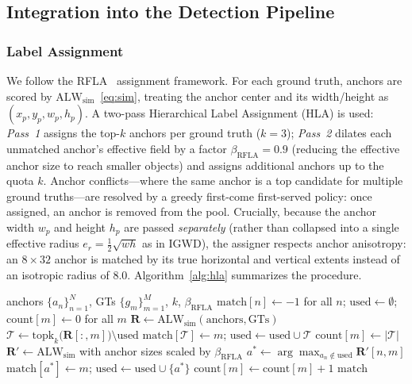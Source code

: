 \documentclass[journal]{IEEEtran}
\newcommand{\alw}{\text{ALW}}
\begin{document}
\subsection{Integration into the Detection Pipeline}

\subsubsection{Label Assignment}

We follow the RFLA~\cite{xu2022rfla} assignment framework. For each ground truth, anchors
are scored by $\alw_{\text{sim}}$~\eqref{eq:sim}, treating the anchor center
and its width/height as $(x_p,y_p,w_p,h_p)$. A two-pass Hierarchical Label
Assignment (HLA) is used: \emph{Pass~1} assigns the top-$k$ anchors per
ground truth ($k=3$); \emph{Pass~2} dilates each unmatched anchor's effective
field by a factor $\beta_{\text{RFLA}}=0.9$ (reducing the effective anchor size to
reach smaller objects) and assigns additional anchors up to the quota $k$.
Anchor conflicts---where the same anchor is a top candidate for multiple
ground truths---are resolved by a greedy first-come first-served policy:
once assigned, an anchor is removed from the pool.
Crucially, because the
anchor width $w_p$ and height $h_p$ are passed \emph{separately} (rather than
collapsed into a single effective radius $e_r=\tfrac12\sqrt{wh}$ as in IGWD),
the assigner respects anchor anisotropy: an $8\times32$ anchor is matched by
its true horizontal and vertical extents instead of an isotropic radius of
$8.0$. Algorithm~\ref{alg:hla} summarizes the procedure.

\begin{algorithm}[t]
\caption{ALW Hierarchical Label Assignment}
\label{alg:hla}
\begin{algorithmic}[1]
\Require anchors $\{a_n\}_{n=1}^{N}$, GTs $\{g_m\}_{m=1}^{M}$, $k$, $\beta_{\text{RFLA}}$
\State $\text{match}[n]\gets -1$ for all $n$;
  $\text{used}\gets\emptyset$;
  $\text{count}[m]\gets 0$ for all $m$
\State $\mathbf{R}\gets \alw_{\text{sim}}(\text{anchors},\text{GTs})$ 
 
  \State $\mathcal{T}\gets \mathrm{topk}_k\big(\mathbf{R}[:,m]\big) \setminus \text{used}$
  \State $\text{match}[\mathcal{T}]\gets m$;\; $\text{used}\gets \text{used}\cup\mathcal{T}$
  \State $\text{count}[m]\gets |\mathcal{T}|$
\EndFor
\State $\mathbf{R}'\gets \alw_{\text{sim}}$ with anchor sizes scaled by $\beta_{\text{RFLA}}$ 
 
     \State $a^* \gets \arg\max_{a_n\notin\text{used}} \mathbf{R}'[n,m]$
     \State $\text{match}[a^*]\gets m$;\; $\text{used}\gets \text{used}\cup\{a^*\}$
     \State $\text{count}[m]\gets \text{count}[m]+1$
  \EndWhile
\EndFor
\State \Return $\text{match}$
\end{algorithmic}
\end{algorithm}
\end{document}
